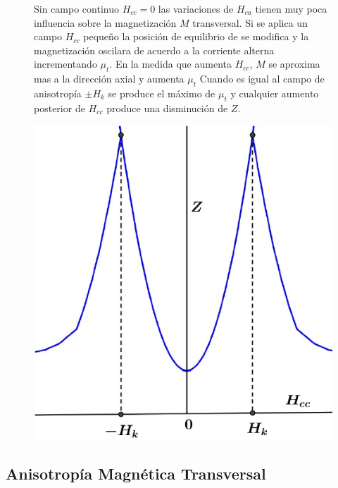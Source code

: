 \begin{figure}[H]
  \begin{minipage}[b]{0.47\textwidth}
Sin campo continuo $H_{cc}=0$ las variaciones de $H_{ca}$ tienen muy poca influencia sobre la magnetización $M$ transversal. Si se aplica un campo $H_{cc}$ pequeño la posición de equilibrio de se modifica y la magnetización oscilara de acuerdo a la corriente alterna incrementando $\mu_{t}$. En la medida que aumenta $H_{cc}$, $M$ se
aproxima mas a la dirección axial y aumenta $\mu_{t}$ Cuando es igual al campo de anisotropía $\pm H_{k}$ se produce el máximo de $\mu_{t}$ y cualquier aumento posterior de $H_{cc}$ produce una disminución de $Z$.
  \vspace{1.0cm}
  \end{minipage}
  \hfill
  \begin{minipage}[b]{0.47\textwidth}
     \includegraphics[width=1.0\textwidth]{./Figures/fig325}
	\label{fig:325}
	  \vspace{0.0cm}
  \end{minipage}
\end{figure}

\subsection{Anisotropía Magnética Transversal}

